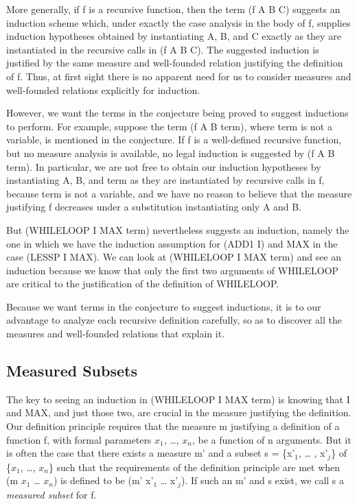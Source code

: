 \documentclass[11pt]{book}
\newcommand{\pubinlineunderline}[1]{\emph{#1}}
\newcommand{\pubdefaulttextsize}{\large}
\begin{document}
More generally, if f is a  recursive function, then the term (f A B C)
suggests an induction scheme which,
under exactly the case analysis
in the body of f, supplies induction hypotheses obtained by instantiating
A, B, and C exactly as they are instantiated in the recursive calls
in (f A B C).  The suggested induction is justified by the
same measure and well-founded relation justifying the definition of f.
Thus, at first sight there is no apparent need for us to consider
measures and well-founded relations explicitly for induction.

However, we want the terms in the conjecture being proved to suggest
inductions to perform.  For example, suppose the term (f A B term),
where term is not a variable, is mentioned in the conjecture.
If f is a well-defined recursive function, but no measure
analysis is available, no legal induction is suggested by (f A B term).
In particular, we are not free to obtain our induction hypotheses by
instantiating A, B, and term as they are instantiated by recursive calls in f,
because term is not a variable, and we have no reason to believe that the
measure justifying f decreases under a substitution instantiating
only A and B.

But (WHILELOOP I MAX term) nevertheless suggests an induction, namely
the one in which we have the induction assumption
for (ADD1 I) and MAX in the case  (LESSP I MAX).
We can look at (WHILELOOP I MAX term) and see
an induction because we know that only the first two arguments
of WHILELOOP are  critical to the justification of the definition of WHILELOOP.

Because we want terms in the conjecture to suggest inductions,
it is to our advantage to analyze each recursive definition carefully, so as
to discover all the measures and well-founded relations that explain
it.
\subsection{Measured Subsets}
\pubdefaulttextsize
The key to seeing an induction in (WHILELOOP I MAX term) is
knowing that I and MAX, and just those two, are crucial in the measure
justifying the definition.  Our definition principle requires that
the measure m justifying a definition of a function f, with
formal parameters $x_{1}$, \ldots{}, $x_{n}$, be a function of n arguments.
But it is often the case that there exists a measure m' and a subset
s = \{x'$_{1}$, \ldots{} , x'$_{j}$\} of \{$x_{1}$, \ldots{}, $x_{n}$\} such that the
requirements of the definition principle are met when (m $x_{1}$ \ldots{} $x_{n}$)
is defined to be (m' x'$_{1}$ \ldots{} x'$_{j}$).  If such an m' and s
exist, we call s a \pubinlineunderline{measured subset} for f.
\end{document}
